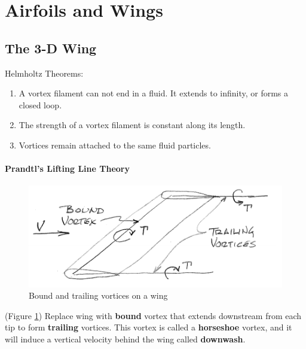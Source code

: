 \documentclass[draft=false, titlepage]{article}
\begin{document}
\section{Airfoils and Wings}
\subsection{The 3-D Wing}
Helmholtz Theorems:
\begin{enumerate}
	\item A vortex filament can not end in a fluid. It extends to infinity, or forms a closed loop.
	\item The strength of a vortex filament is constant along its length.
	\item Vortices remain attached to the same fluid particles.
\end{enumerate}
\paragraph*{Prandtl's Lifting Line Theory}
\begin{figure}[ht]
	\centering
	\includegraphics[width=0.6\linewidth]{Figures/p32_liftingLine.PNG}
	\caption{Bound and trailing vortices on a wing}
	\label{fig:p32_liftingLine}
\end{figure}
(Figure \ref{fig:p32_liftingLine}) Replace wing with \textbf{bound} vortex that extends downstream from each tip to form \textbf{trailing} vortices. This vortex is called a \textbf{horseshoe} vortex, and it will induce a vertical velocity behind the wing called \textbf{downwash}.
\end{document}
